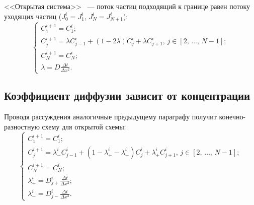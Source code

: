 <<Открытая система>> ~--- поток частиц подходящий к границе равен потоку уходящих частиц ($J_{0}^{i} = J_{1}^{i}$, $J_{N}^{i} = J_{N+1}^{i}$):
\begin{equation}
	\label{eq:DDiffConst}
	\begin{cases}
		C^{i+1}_{1} = C^{i}_{1};\\
		C^{i+1}_{j} = \lambda C^{i}_{j-1} + (1 - 2\lambda)C^{i}_{j} + \lambda C^{i}_{j+1},\,j \in [2,\,\dots,\,N-1];\\
		C^{i+1}_{N} = C^{i}_{N};\\
		\lambda = D\frac{\Delta t}{\Delta x^{2}}.
	\end{cases}
\end{equation}

\subsection{Коэффициент диффузии зависит от концентрации}



Проводя рассуждения аналогичные предыдущему параграфу получит конечно-разностную схему для открытой схемы:
\begin{equation}
	\begin{cases}
		C^{i+1}_{1} = C^{i}_{1};\\
		C^{i+1}_{j} = \lambda_{-}^{i} C^{i}_{j-1} + (1 - \lambda^{i}_{+} - \lambda^{i}_{-})C^{i}_{j} + \lambda^{i}_{+} C^{i}_{j+1},\,j \in [2,\,\dots,\,N-1];\\
		C^{i+1}_{N} = C^{i}_{N};\\
		\lambda^{i}_{+} = D_{j+}^{i}\frac{\Delta t}{\Delta x^{2}};\\
		\lambda^{i}_{-} = D_{j-}^{i}\frac{\Delta t}{\Delta x^{2}}.
	\end{cases}
\end{equation}
